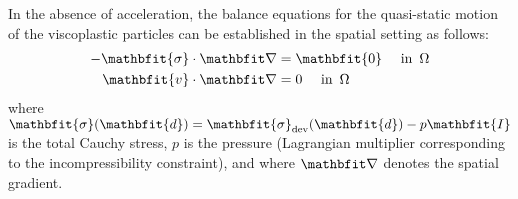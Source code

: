 \documentclass[10pt,a4paper]{article}
\renewcommand{\ta}[1]{\mathbfit{#1}}
\renewcommand{\ts}[1]{\mathbfit{#1}}
\begin{document}
In the absence of acceleration, the balance equations for the quasi-static motion of the viscoplastic particles can be established in the spatial setting as follows:
\begin{align}
    -\ts{\sigma}\cdot\diff & = \ts{0} \quad \mbox{ in }\,\Omega
\label{eq204a}
\\
    \ta{v}\cdot\diff & = 0 \quad \mbox{ in }\,\Omega
\label{eq204b}
\end{align}
where $\ts{\sigma}(\ts{d})=\ts{\sigma}_\dev(\ts{d})-p\ts{I}$ is the total Cauchy stress, $p$ is the pressure (Lagrangian multiplier corresponding to the incompressibility constraint), and
where $\diff$ denotes the spatial gradient.
\end{document}
